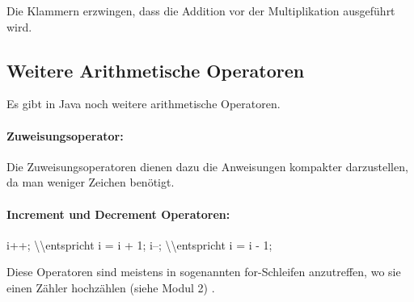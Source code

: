 \documentclass[10pt,paper=17cm:22cm, twoside=true, DIV=14]{scrbook}
\newenvironment {Shaded}
        {\begin{mdframed}[style=code] }
         {\end{mdframed}}
\newcommand{\DecValTok}[1]{\textcolor[rgb]{0.4,0.4,0.4}{{#1}}}
\newcommand{\NormalTok}[1]{#1}
\begin{document}
Die Klammern erzwingen, dass die Addition vor der Multiplikation
ausgeführt wird.

\subsection{Weitere Arithmetische
Operatoren}\label{weitere-arithmetische-operatoren-1}

Es gibt in Java noch weitere arithmetische Operatoren.

\paragraph{Zuweisungsoperator:}\label{zuweisungsoperator-1}

\begin{Shaded}
\end{Shaded}

Die Zuweisungsoperatoren dienen dazu die Anweisungen kompakter
darzustellen, da man weniger Zeichen benötigt.

\paragraph{Increment und Decrement
Operatoren:}\label{increment-und-decrement-operatoren-1}

\begin{Shaded}
\begin{Highlighting}[]
\NormalTok{i++; \textbackslash{}\textbackslash{}entspricht i = i + }\DecValTok{1}\NormalTok{;}
\NormalTok{i--; \textbackslash{}\textbackslash{}entspricht i = i - }\DecValTok{1}\NormalTok{;}
\end{Highlighting}
\end{Shaded}

Diese Operatoren sind meistens in sogenannten for-Schleifen anzutreffen,
wo sie einen Zähler hochzählen (siehe Modul 2) .
\end{document}
